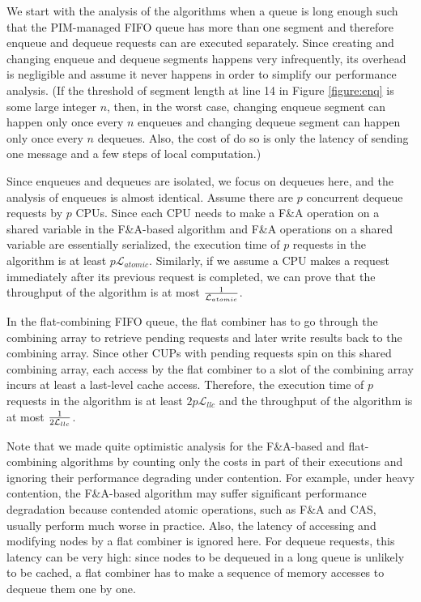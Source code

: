 \documentclass[11pt]{article}
\newcommand{\latllc} {\mathcal{L}_{llc}}
\newcommand{\latato} {\mathcal{L}_{atomic}}
\begin{document}
We start with the analysis of the algorithms when a queue is long enough such that the PIM-managed 
FIFO queue has more than one segment and 
therefore enqueue and dequeue requests can are executed separately. 
Since creating and changing enqueue and dequeue segments happens very infrequently, its overhead is negligible and assume it never happens in order to simplify our performance analysis.
(If the threshold of segment length at line 14 in Figure \ref{figure:enq} is some large integer $n$, 
then, in the worst case, changing enqueue segment can happen only once every $n$ enqueues and 
changing dequeue segment can happen only once every $n$ dequeues. 
Also, the cost of do so is only the latency of sending one message and a few steps of local computation.)

Since enqueues and dequeues are isolated, we focus on dequeues here,
and the analysis of enqueues is almost identical. 
Assume there are $p$ concurrent dequeue requests by $p$ CPUs. 
Since each CPU needs to make a F\&A operation on a shared variable in the F\&A-based algorithm and 
F\&A operations on a shared variable are essentially serialized, 
the execution time of $p$ requests in the algorithm is at least $p\latato$. 
Similarly, if we assume a CPU makes a request immediately after its previous request is completed, 
we can prove that the throughput of the algorithm is at most ${1 \over \latato}$.

In the flat-combining FIFO queue, the flat combiner has to go through the combining array to 
retrieve pending requests and later write results back to the combining array. 
Since other CUPs with pending requests spin on this shared combining array, 
each access by the flat combiner to a slot of the combining array incurs at least a last-level cache access. 
Therefore, the execution time of $p$ requests in the algorithm is at least $2p\latllc$ and 
the throughput of the algorithm is at most ${1 \over 2\latllc}$.

Note that we made quite optimistic analysis for the F\&A-based and flat-combining algorithms 
by counting only the costs in part of their executions and ignoring their performance degrading under contention. 
For example, under heavy contention, the F\&A-based algorithm may suffer significant performance degradation 
because contended atomic operations, such as F\&A and CAS, usually perform much worse in practice.  
Also, the latency of accessing and modifying nodes by a flat combiner is ignored here. 
For dequeue requests, this latency can be very high: since nodes to be dequeued in a long queue is unlikely to 
be cached, a flat combiner has to make a sequence of memory accesses to dequeue them one by one.  
\end{document}
